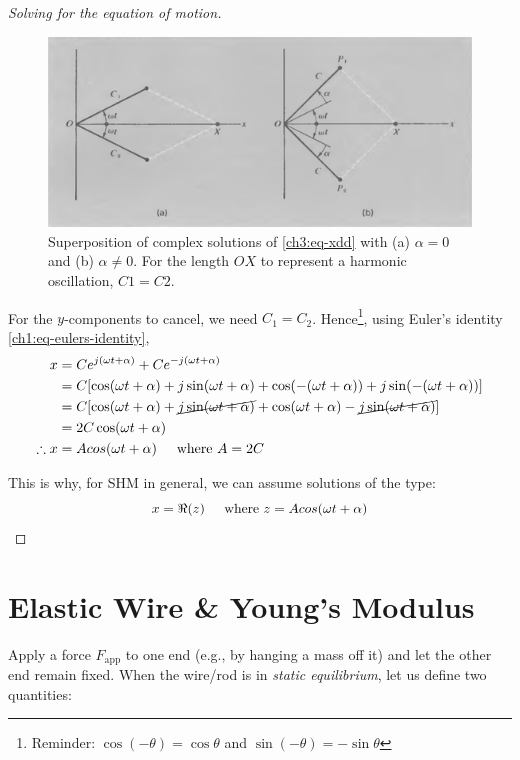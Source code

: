 \begin{proof}[Solving for the equation of motion]
\begin{figure}[h]
	\centering
	\includegraphics[scale=0.7]{phys232/Ch3-adding-complex-solutions.png} \caption{Superposition of complex solutions of \eqref{ch3:eq-xdd} with (a) $\alpha=0$ and (b) $\alpha\neq 0$. For the length $OX$ to represent a harmonic oscillation, $C1=C2$.}
	\label{ch3:fig-complex-sols}
\end{figure}


For the $y$-components to cancel, we need $C_1=C_2$. Hence\footnote{Reminder: $\cos(-\theta)=\cos\theta$ and $\sin(-\theta)=-\sin\theta$}, using Euler's identity \eqref{ch1:eq-eulers-identity},
\begin{align*}
x
&=Ce^{j(\omega t +\alpha)} + Ce^{-j(\omega t +\alpha)} \\
&=C[\cos(\omega t + \alpha) + j\sin(\omega t + \alpha) + \cos(-(\omega t + \alpha)) + j\sin(-(\omega t + \alpha))] \\
&=C[\cos(\omega t + \alpha) + \cancel{j\sin(\omega t + \alpha)} + \cos(\omega t + \alpha) - \cancel{j\sin(\omega t + \alpha)}] \\
&= 2C\cos(\omega t + \alpha) \\
\therefore
x &= Acos(\omega t + \alpha) \hspace{0.5cm}\text{where } A=2C
\end{align*}

This is why, for SHM in general, we can assume solutions of the type:
\begin{equation}
	x=\Re(z) \hspace{0.5cm}\text{where } z=Acos(\omega t + \alpha)
\end{equation}
\end{proof}


\section{Elastic Wire \& Young's Modulus} \label{ch3:sec-wire}

Apply a force $F_\text{app}$ to one end (e.g., by hanging a mass off it) and let the other end remain fixed. When the wire/rod is in \textit{static equilibrium}, let us define two quantities:

